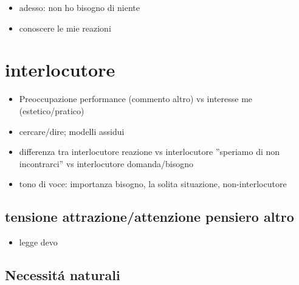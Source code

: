 \begin{itemize}

\item adesso: non ho bisogno di niente

\item conoscere le mie reazioni

\end{itemize}


\section{interlocutore}

\begin{itemize}

\item Preoccupazione performance (commento altro) vs interesse me (estetico/pratico)

\item cercare/dire; modelli assidui

\item differenza tra interlocutore reazione vs interlocutore ''speriamo di non incontrarci'' vs interlocutore domanda/bisogno

\item tono di voce: importanza bisogno, la solita situazione, non-interlocutore

\end{itemize}

\subsection{tensione attrazione/attenzione pensiero altro}

\begin{itemize}

\item legge devo

\end{itemize}


\subsection{Necessit\'a naturali}

